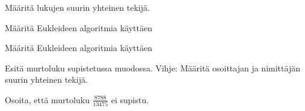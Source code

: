 \begin{tehtavasivu}

\begin{tehtava}
    Määritä lukujen suurin yhteinen tekijä.
    

    \begin{vastaus}
    \end{vastaus}
    
\end{tehtava}

\begin{tehtava}
    Määritä Eukleideen algoritmia käyttäen
    

    \begin{vastaus}
    \end{vastaus}
    
\end{tehtava}

\begin{tehtava}
    Määritä Eukleideen algoritmia käyttäen
    

    \begin{vastaus}
    \end{vastaus}
    
\end{tehtava}

\begin{tehtava}
    Esitä murtoluku
    supistetussa muodossa. Vihje: Määritä osoittajan ja nimittäjän suurin yhteinen tekijä.

    \begin{vastaus}
    \end{vastaus}
    
\end{tehtava}

\begin{tehtava}
    Osoita, että murtoluku $\frac{8788}{13475}$ ei supistu.
\end{tehtava}


\end{tehtavasivu}
